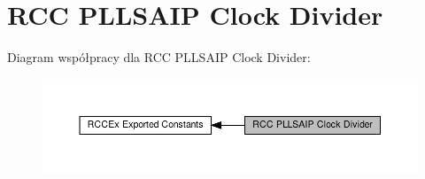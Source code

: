 \hypertarget{group___r_c_c_ex___p_l_l_s_a_i_p___clock___divider}{}\section{R\+CC P\+L\+L\+S\+A\+IP Clock Divider}
\label{group___r_c_c_ex___p_l_l_s_a_i_p___clock___divider}
Diagram współpracy dla R\+CC P\+L\+L\+S\+A\+IP Clock Divider\+:\nopagebreak
\begin{figure}[H]
\begin{center}
\leavevmode
\includegraphics[width=350pt]{group___r_c_c_ex___p_l_l_s_a_i_p___clock___divider}
\end{center}
\end{figure}
